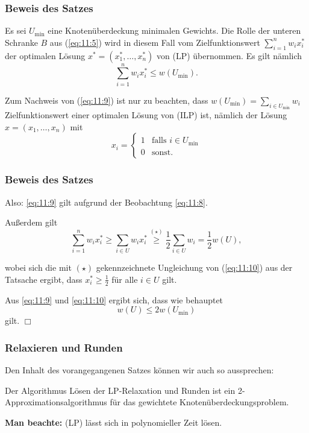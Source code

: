 \documentclass[smaller]{beamer}
\begin{document}
\begin{frame}
\frametitle{Beweis des Satzes}
Es sei $U_{\text{min}}$ eine Knotenüberdeckung minimalen Gewichts. Die Rolle der unteren Schranke $B$ aus (\ref{eq:11:5}) wird in diesem Fall vom Zielfunktionswert $\sum\limits_{i=1}^{n}{w_ix_i^*}$ der optimalen Lösung $x^* = (x_1^*,\ldots,x_n^*)$ von (LP) übernommen. Es gilt nämlich 
\begin{equation}
\label{eq:11:9}
\sum\limits_{i=1}^{n}{w_ix_i^*} \leq w \left( U_{\text{min}} \right).
\end{equation}

Zum Nachweis von (\ref{eq:11:9}) ist nur zu beachten, dass $w\left(U_{\text{min}} \right) = \sum\limits_{i \in U_{\text{min}}}{w_i}$ Zielfunktionswert einer optimalen Lösung von (ILP) ist, nämlich der Lösung $x=(x_1,\ldots,x_n)$ mit
\[
x_i = \begin{cases}
1 & \text{falls } i \in U_{\text{min}} \\
0 & \text{sonst}.
\end{cases}
\]
\end{frame}

\begin{frame}
\frametitle{Beweis des Satzes}
Also: \eqref{eq:11:9} gilt aufgrund der Beobachtung \eqref{eq:11:8}. \\ \vspace*{0.2cm}

Außerdem gilt
\begin{equation}
\label{eq:11:10}
\sum\limits_{i=1}^{n}{w_ix_i^*} \geq \sum\limits_{i \in U}{w_ix_i^*} \stackrel{(\star)}{\geq} \frac{1}{2} \sum\limits_{i \in U}{w_i} = \frac{1}{2}w(U),
\end{equation}

wobei sich die mit $(\star)$ gekennzeichnete Ungleichung von (\ref{eq:11:10}) aus der Tatsache ergibt, dass $x_i^* \geq \frac{1}{2}$ für alle $i \in U$ gilt. \\ \vspace*{0.2cm}

Aus \eqref{eq:11:9} und \eqref{eq:11:10} ergibt sich, dass wie behauptet
\[
w(U) \leq 2w\left(U_{\text{min}}\right)
\]
gilt. \qquad $\Box$
\end{frame}

\begin{frame}
\frametitle{Relaxieren und Runden}
Den Inhalt des vorangegangenen Satzes können wir auch so aussprechen: \\ \vspace*{0.2cm}

\alert{Der Algorithmus {\glqq}Lösen der LP-Relaxation und Runden{\grqq} ist ein 2-Approximationsalgorithmus für das gewichtete Knotenüberdeckungsproblem}. \\ \vspace*{0.2cm}

\textbf{Man beachte:} (LP) lässt sich in \alert{polynomieller Zeit} lösen.
\end{frame}
\end{document}
